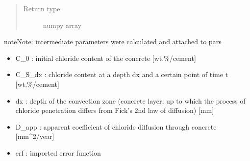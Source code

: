 \documentclass[letterpaper,10pt,english]{sphinxmanual}
\begin{document}
\begin{fulllineitems}
\begin{quote}
\begin{description}
\item[{Return type}] \leavevmode
\sphinxAtStartPar
numpy array

\end{description}\end{quote}

\begin{sphinxadmonition}{note}{Note:}
\sphinxAtStartPar
intermediate parameters were calculated and attached to pars
\begin{itemize}
\item {} 
\sphinxAtStartPar
C\_0    : initial chloride content of the concrete {[}wt\sphinxhyphen{}.\%/cement{]}

\item {} 
\sphinxAtStartPar
C\_S\_dx : chloride content at a depth dx and a certain point of time t {[}wt\sphinxhyphen{}.\%/cement{]}

\item {} 
\sphinxAtStartPar
dx     : depth of the convection zone (concrete layer, up to which the process of chloride penetration differs from Fick’s 2nd law of diffusion) {[}mm{]}

\item {} 
\sphinxAtStartPar
D\_app  : apparent coefficient of chloride diffusion through concrete {[}mm\textasciicircum{}2/year{]}

\item {} 
\sphinxAtStartPar
erf    : imported error function

\end{itemize}
\end{sphinxadmonition}

\end{fulllineitems}

\end{document}
